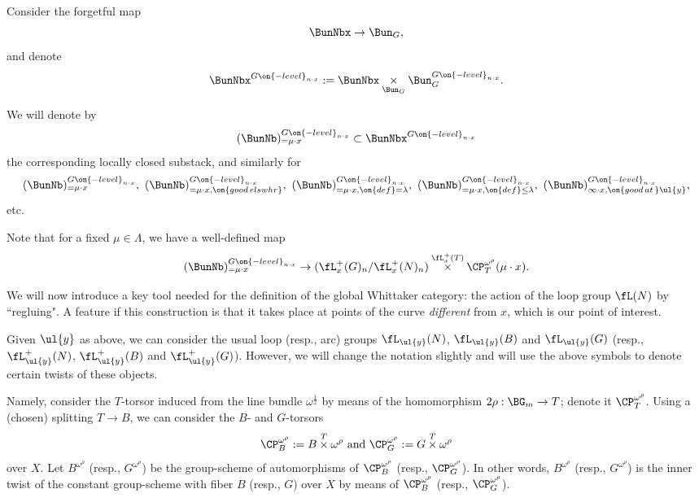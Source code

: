 \documentclass[9pt]{amsart}
\theoremstyle{definition}
\theoremstyle{remark}
\numberwithin{equation}{section}
\begin{document}
Consider the forgetful map
$$\BunNbx\to \Bun_G,$$
and denote
$$\BunNbx^{G\on{-level}_{n\cdot x}}:=\BunNbx\underset{\Bun_G}\times \Bun_G^{G\on{-level}_{n\cdot x}}.$$

\medskip

We will denote by
$$(\BunNb)_{=\mu\cdot x}^{G\on{-level}_{n\cdot x}}\subset \BunNbx^{G\on{-level}_{n\cdot x}}$$
the corresponding locally closed substack, and similarly for 
$$(\BunNb)_{=\mu\cdot x}^{G\on{-level}_{n\cdot x}},\,\, (\BunNb)_{=\mu\cdot x,\on{good\,elswhr}}^{G\on{-level}_{n\cdot x}},\,\,
(\BunNb)_{=\mu\cdot x,\on{def}=\lambda}^{G\on{-level}_{n\cdot x}},\,\, 
(\BunNb)_{=\mu\cdot x,\on{def}\leq\lambda}^{G\on{-level}_{n\cdot x}},\,\,
(\BunNb)_{\infty\cdot x,\on{good\,at\,}\ul{y}}^{G\on{-level}_{n\cdot x}},$$
etc. 

\sssec{}

Note that for a fixed $\mu\in \Lambda$, we have a well-defined map
\begin{equation}  \label{e:eval x}
(\BunNb)^{G\on{-level}_{n\cdot x}}_{=\mu\cdot x}\to
(\fL^+_x(G)_n/\fL^+_x(N)_n)\overset{\fL^+_x(T)}\times \CP^{\omega^\rho}_T(\mu\cdot x).
\end{equation}


We will now introduce a key tool needed for the definition of the global Whittaker category: the 
action of the loop group $\fL(N)$ by ``regluing". A feature if this construction is that it takes place
at points of the curve \emph{different} from $x$, which is our point of interest. 

\sssec{}  \label{sss:twist of N}

Given $\ul{y}$ as above, we can consider the usual loop (resp., arc) groups $\fL_{\ul{y}}(N)$, $\fL_{\ul{y}}(B)$ and $\fL_{\ul{y}}(G)$
(resp., $\fL^+_{\ul{y}}(N)$,  $\fL^+_{\ul{y}}(B)$ and $\fL^+_{\ul{y}}(G)$).
However, we will change the notation slightly and will use the above symbols to denote 
certain twists of these objects.

\medskip

Namely, consider the $T$-torsor induced from the line bundle $\omega^{\frac{1}{2}}$ by means of the homomorphism
$2\rho:\BG_m\to T$; denote it $\CP^{\omega^\rho}_T$.  Using a (chosen) splitting $T\to B$, we can consider the $B$- and $G$-torsors
$$\CP^{\omega^\rho}_B:=B\overset{T}\times \omega^\rho \text{ and }
\CP^{\omega^\rho}_G:=G\overset{T}\times \omega^\rho$$
over $X$.  Let $B^{\omega^\rho}$ (resp., $G^{\omega^\rho}$) be the group-scheme of automorphisms of $\CP^{\omega^\rho}_B$ 
(resp., $\CP^{\omega^\rho}_G$). In other words, $B^{\omega^\rho}$ (resp., $G^{\omega^\rho}$) is the inner twist of 
the constant group-scheme with fiber $B$ (resp., $G$) over $X$ by means of $\CP^{\omega^\rho}_B$ (resp., $\CP^{\omega^\rho}_G$). 
\end{document}
